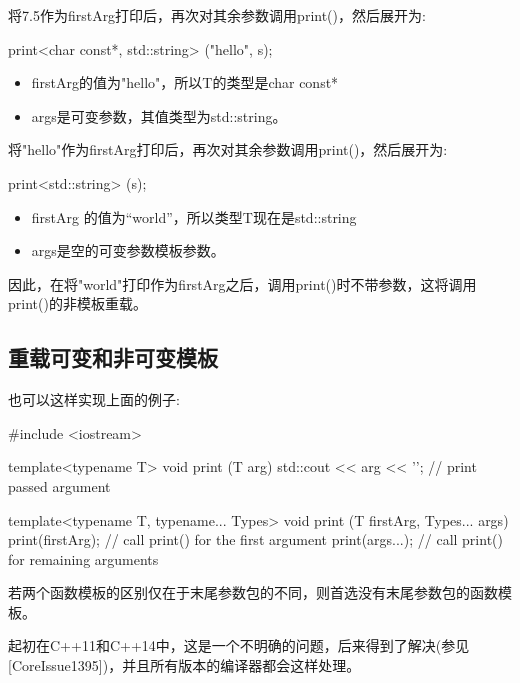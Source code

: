 将7.5作为firstArg打印后，再次对其余参数调用print()，然后展开为:

\begin{cpp}
print<char const*, std::string> ("hello", s);
\end{cpp}

\begin{itemize}
\item 
firstArg的值为"hello"，所以T的类型是char const*

\item 
args是可变参数，其值类型为std::string。
\end{itemize}

将"hello"作为firstArg打印后，再次对其余参数调用print()，然后展开为:

\begin{cpp}
print<std::string> (s);
\end{cpp}

\begin{itemize}
\item 
firstArg 的值为“world”，所以类型T现在是std::string

\item 
args是空的可变参数模板参数。
\end{itemize}

因此，在将"world"打印作为firstArg之后，调用print()时不带参数，这将调用print()的非模板重载。

\subsection{重载可变和非可变模板}

也可以这样实现上面的例子:

\begin{cpp}
#include <iostream>

template<typename T>
void print (T arg)
{
	std::cout << arg << '\n'; // print passed argument
}

template<typename T, typename... Types>
void print (T firstArg, Types... args)
{
	print(firstArg); // call print() for the first argument
	print(args...); // call print() for remaining arguments
}
\end{cpp}

若两个函数模板的区别仅在于末尾参数包的不同，则首选没有末尾参数包的函数模板。

\begin{notice}起初在C++11和C++14中，这是一个不明确的问题，后来得到了解决(参见[CoreIssue1395])，并且所有版本的编译器都会这样处理。
\end{notice}

